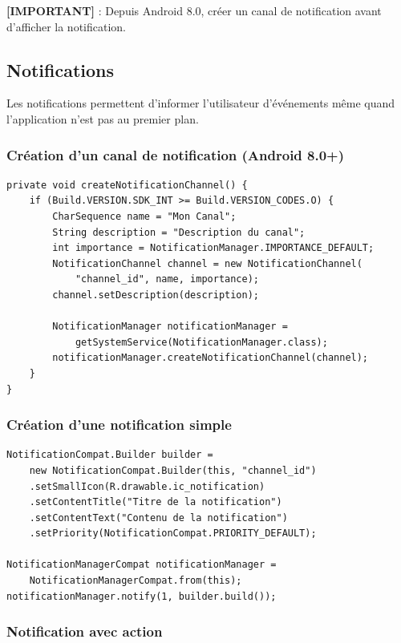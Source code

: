 \documentclass[11pt,a4paper]{article}
\begin{document}
\textbf{[IMPORTANT]} : Depuis Android 8.0, créer un canal de notification avant d'afficher la notification.

\subsection{Notifications}

Les notifications permettent d'informer l'utilisateur d'événements même quand l'application n'est pas au premier plan.

\subsubsection{Création d'un canal de notification (Android 8.0+)}

\begin{lstlisting}
private void createNotificationChannel() {
    if (Build.VERSION.SDK_INT >= Build.VERSION_CODES.O) {
        CharSequence name = "Mon Canal";
        String description = "Description du canal";
        int importance = NotificationManager.IMPORTANCE_DEFAULT;
        NotificationChannel channel = new NotificationChannel(
            "channel_id", name, importance);
        channel.setDescription(description);
        
        NotificationManager notificationManager = 
            getSystemService(NotificationManager.class);
        notificationManager.createNotificationChannel(channel);
    }
}
\end{lstlisting}

\subsubsection{Création d'une notification simple}

\begin{lstlisting}
NotificationCompat.Builder builder = 
    new NotificationCompat.Builder(this, "channel_id")
    .setSmallIcon(R.drawable.ic_notification)
    .setContentTitle("Titre de la notification")
    .setContentText("Contenu de la notification")
    .setPriority(NotificationCompat.PRIORITY_DEFAULT);

NotificationManagerCompat notificationManager = 
    NotificationManagerCompat.from(this);
notificationManager.notify(1, builder.build());
\end{lstlisting}

\subsubsection{Notification avec action}
\end{document}
